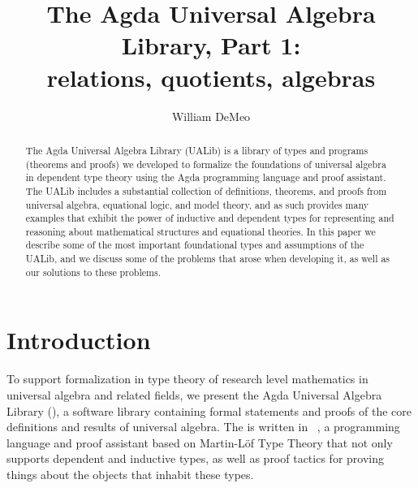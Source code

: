 \documentclass[a4paper,UKenglish,cleveref,autoref,thm-restate,11pt]{lipics-v2021}
\title{The Agda Universal Algebra Library, Part 1:\\relations, quotients, algebras}
\author{William DeMeo}
       {Department of Algebra, Charles University in Prague \and \url{https://williamdemeo.gitlab.io}}
       {williamdemeo@gmail.com}
       {https://orcid.org/0000-0003-1832-5690}
       {}
\begin{document}
\maketitle


\begin{abstract}
The Agda Universal Algebra Library (UALib) is a library of types and programs (theorems and proofs) we developed to formalize the foundations of universal algebra in dependent type theory using the Agda programming language and proof assistant. 
 The UALib includes a substantial collection of definitions, theorems, and proofs from universal algebra, equational logic, and model theory, and as such provides many examples that exhibit the power of inductive and dependent types for representing and reasoning about mathematical structures and equational theories. In this paper we describe some of the most important foundational types and assumptions of the UALib, and we discuss some of the problems that arose when developing it, as well as our solutions to these problems.
\end{abstract}

\section{Introduction}\label{sec:introduction}
To support formalization in type theory of research level mathematics in universal algebra and related fields, we present the Agda Universal Algebra Library (\agdaualib), a software library containing formal statements and proofs of the core definitions and results of universal algebra. 
The \ualib is written in \agda~\cite{Norell:2009}, a programming language and proof assistant based on Martin-L\"of Type Theory that not only supports dependent and inductive types, as well as proof tactics for proving things about the objects that inhabit these types.
\end{document}
